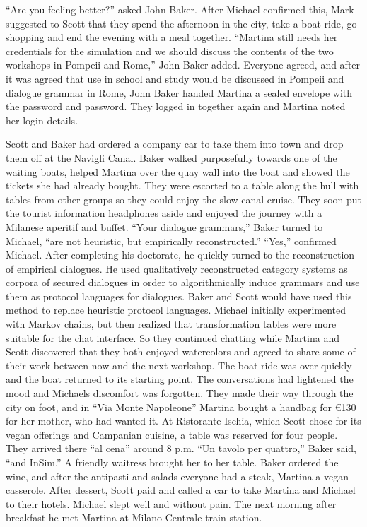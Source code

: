 \documentclass[
]{article}
\begin{document}
``Are you feeling better?'' asked John Baker. After Michael confirmed
this, Mark suggested to Scott that they spend the afternoon in the city,
take a boat ride, go shopping and end the evening with a meal together.
``Martina still needs her credentials for the simulation and we should
discuss the contents of the two workshops in Pompeii and Rome,'' John
Baker added. Everyone agreed, and after it was agreed that use in school
and study would be discussed in Pompeii and dialogue grammar in Rome,
John Baker handed Martina a sealed envelope with the password and
password. They logged in together again and Martina noted her login
details.

Scott and Baker had ordered a company car to take them into town and
drop them off at the Navigli Canal. Baker walked purposefully towards
one of the waiting boats, helped Martina over the quay wall into the
boat and showed the tickets she had already bought. They were escorted
to a table along the hull with tables from other groups so they could
enjoy the slow canal cruise. They soon put the tourist information
headphones aside and enjoyed the journey with a Milanese aperitif and
buffet. ``Your dialogue grammars,'' Baker turned to Michael, ``are not
heuristic, but empirically reconstructed.'' ``Yes,'' confirmed Michael.
After completing his doctorate, he quickly turned to the reconstruction
of empirical dialogues. He used qualitatively reconstructed category
systems as corpora of secured dialogues in order to algorithmically
induce grammars and use them as protocol languages
\hspace{0pt}\hspace{0pt}for dialogues. Baker and Scott would have used
this method to replace heuristic protocol languages. Michael initially
experimented with Markov chains, but then realized that transformation
tables were more suitable for the chat interface. So they continued
chatting while Martina and Scott discovered that they both enjoyed
watercolors and agreed to share some of their work between now and the
next workshop. The boat ride was over quickly and the boat returned to
its starting point. The conversations had lightened the mood and
Michael\textquotesingle s discomfort was forgotten. They made their way
through the city on foot, and in ``Via Monte Napoleone'' Martina bought
a handbag for €130 for her mother, who had wanted it. At Ristorante
Ischia, which Scott chose for its vegan offerings and Campanian cuisine,
a table was reserved for four people. They arrived there ``al cena''
around 8 p.m. ``Un tavolo per quattro,'' Baker said, ``and InSim.'' A
friendly waitress brought her to her table. Baker ordered the wine, and
after the antipasti and salads everyone had a steak, Martina a vegan
casserole. After dessert, Scott paid and called a car to take Martina
and Michael to their hotels. Michael slept well and without pain. The
next morning after breakfast he met Martina at Milano Centrale train
station.
\end{document}
